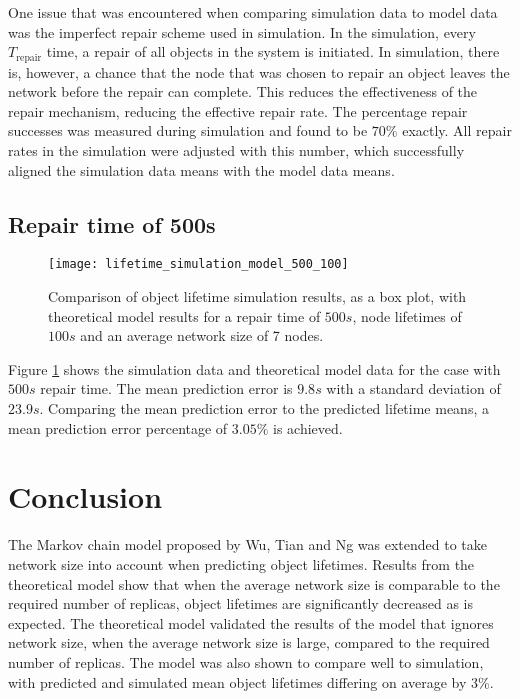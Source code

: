 One issue that was encountered when comparing simulation data to model data was the imperfect repair scheme used in simulation. In the simulation, every $T_{\textrm{repair}}$ time, a repair of all objects in the system is initiated. In simulation, there is, however, a chance that the node that was chosen to repair an object leaves the network before the repair can complete. This reduces the effectiveness of the repair mechanism, reducing the effective repair rate. The percentage repair successes was measured during simulation and found to be $70\%$ exactly. All repair rates in the simulation were adjusted with this number, which successfully aligned the simulation data means with the model data means.

\subsection{Repair time of 500s}

\begin{figure}[htbp]
 \centering
 \texttt{[image: lifetime\_simulation\_model\_500\_100]}
 \caption{Comparison of object lifetime simulation results, as a box plot, with theoretical model results for a repair time of $500s$, node lifetimes of $100s$ and an average network size of 7 nodes.}
 \label{fig_lifetime_simulation_model_500_100}
\end{figure}
%
Figure \ref{fig_lifetime_simulation_model_500_100} shows the simulation data and theoretical model data for the case with $500s$ repair time. The mean prediction error is $9.8s$ with a standard deviation of $23.9s$. Comparing the mean prediction error to the predicted lifetime means, a mean prediction error percentage of $3.05\%$ is achieved.

\section{Conclusion}

The Markov chain model proposed by Wu, Tian and Ng was extended to take network size into account when predicting object lifetimes. Results from the theoretical model show that when the average network size is comparable to the required number of replicas, object lifetimes are significantly decreased as is expected. The theoretical model validated the results of the model that ignores network size, when the average network size is large, compared to the required number of replicas. The model was also shown to compare well to simulation, with predicted and simulated mean object lifetimes differing on average by 3\%.

